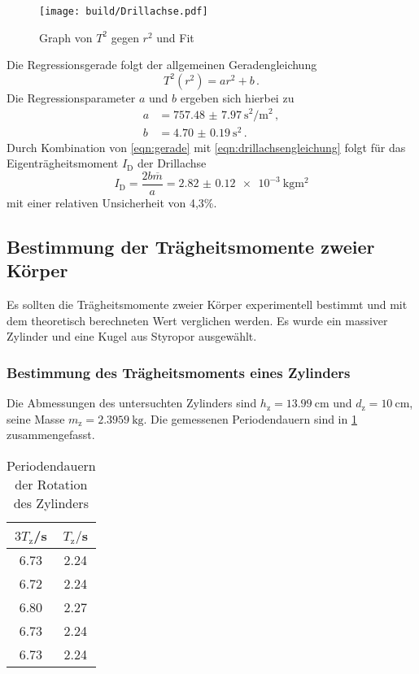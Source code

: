 \begin{figure}[H]
  \centering
  \texttt{[image: build/Drillachse.pdf]}
  \caption{Graph von $T^2$ gegen $r^2$ und Fit}
  \label{fig:drillachse}
\end{figure}

Die Regressionsgerade folgt der allgemeinen Geradengleichung
\begin{equation}
  T^2(r^2) = ar^2+b\,.
  \label{eqn:gerade}
\end{equation}
Die Regressionsparameter $a$ und $b$ ergeben sich hierbei zu
\begin{align}
  a &= \SI{757.48(797)}{\second\squared/\meter\squared}\,,\\
  b &= \SI{4.70(019)}{\second\squared}\,.
\end{align}
Durch Kombination von \eqref{eqn:gerade} mit \eqref{eqn:drillachsengleichung}
folgt für das Eigenträgheitsmoment $I_{\text{D}}$ der Drillachse
\begin{equation}
  I_{\text{D}} = \frac{2b\overline{m}}{a} = \SI{2.82(012)e-3}{\kilogram\meter\squared}
\end{equation}
mit einer relativen Unsicherheit von 4,3\%.
\subsection{Bestimmung der Trägheitsmomente zweier Körper}
Es sollten die Trägheitsmomente zweier Körper experimentell bestimmt und mit dem
theoretisch berechneten Wert verglichen werden. Es wurde ein massiver Zylinder
und eine Kugel aus Styropor ausgewählt.
\subsubsection{Bestimmung des Trägheitsmoments eines Zylinders}
Die Abmessungen des untersuchten Zylinders sind $h_{\text{z}}=\SI{13.99}{\cm}$ und
$d_{\text{z}}=\SI{10}{\cm}$, seine Masse $m_{\text{z}}=\SI{2.3959}{\kilogram}$.
Die gemessenen Periodendauern sind in \ref{tab:zylinder} zusammengefasst.

\begin{table}[H]
\centering
\caption{Periodendauern der Rotation des Zylinders}
\label{tab:zylinder}
\begin{tabular}{c c}
\toprule
$3T_{\text{z}}$/s & $T_{\text{z}}/$s \\
\midrule
6.73 & 2.24 \\
6.72 & 2.24 \\
6.80 & 2.27 \\
6.73 & 2.24 \\
6.73 & 2.24 \\
\bottomrule
\end{tabular}
\end{table}

